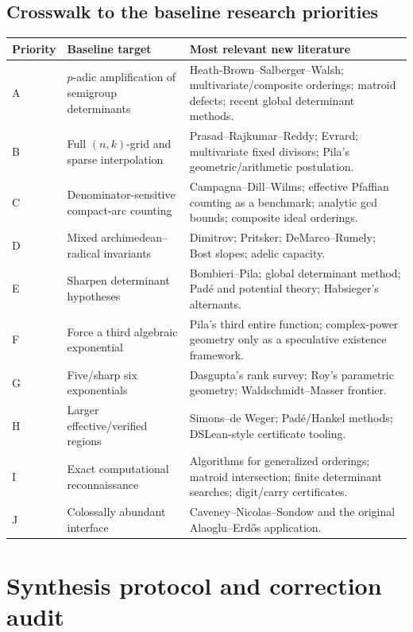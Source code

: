 \documentclass[10pt,letterpaper]{article}
\begin{document}
\subsection{Crosswalk to the baseline research priorities}

\begin{center}
\small
\begin{tabularx}{\textwidth}{L{0.075\textwidth}L{0.27\textwidth}Y}
\toprule
Priority & Baseline target & Most relevant new literature\\
\midrule
A & \(p\)-adic amplification of semigroup determinants & Heath-Brown--Salberger--Walsh;
multivariate/composite orderings; matroid defects; recent global determinant methods.\\
B & Full \((n,k)\)-grid and sparse interpolation & Prasad--Rajkumar--Reddy; Evrard;
multivariate fixed divisors; Pila's geometric/arithmetic postulation.\\
C & Denominator-sensitive compact-arc counting & Campagna--Dill--Wilms; effective Pfaffian
counting as a benchmark; analytic gcd bounds; composite ideal orderings.\\
D & Mixed archimedean--radical invariants & Dimitrov; Pritsker; DeMarco--Rumely; Bost slopes;
adelic capacity.\\
E & Sharpen determinant hypotheses & Bombieri--Pila; global determinant method; Pad\'e and
potential theory; Habsieger's alternants.\\
F & Force a third algebraic exponential & Pila's third entire function; complex-power
geometry only as a speculative existence framework.\\
G & Five/sharp six exponentials & Dasgupta's rank survey; Roy's parametric geometry;
Waldschmidt--Masser frontier.\\
H & Larger effective/verified regions & Simons--de Weger; Pad\'e/Hankel methods; DSLean-style
certificate tooling.\\
I & Exact computational reconnaissance & Algorithms for generalized orderings; matroid
intersection; finite determinant searches; digit/carry certificates.\\
J & Colossally abundant interface & Caveney--Nicolas--Sondow and the original
Alaoglu--Erd\H{o}s application.\\
\bottomrule
\end{tabularx}
\end{center}

\section{Synthesis protocol and correction audit}
\label{sec:audit}
\end{document}
